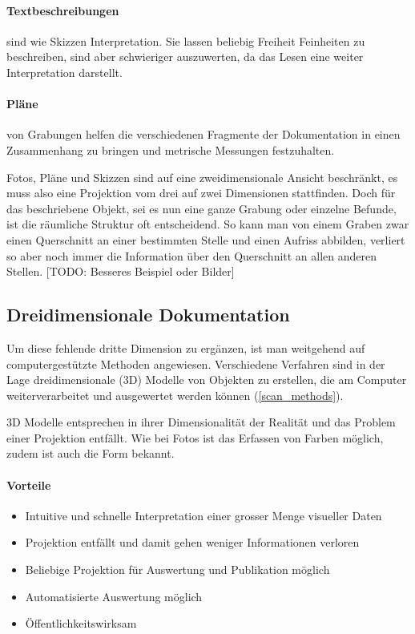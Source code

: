 \documentclass{paper}
\begin{document}
			\paragraph{Textbeschreibungen} sind wie Skizzen Interpretation. Sie lassen beliebig Freiheit Feinheiten zu beschreiben, sind aber schwieriger auszuwerten, da das Lesen eine weiter Interpretation darstellt.
			
			\paragraph{Pläne} von Grabungen helfen die verschiedenen Fragmente der Dokumentation in einen Zusammenhang zu bringen und metrische Messungen festzuhalten.
			
			\mbox{}
			
			Fotos, Pläne und Skizzen sind auf eine zweidimensionale Ansicht beschränkt, es muss also eine Projektion vom drei auf zwei Dimensionen stattfinden. Doch für das beschriebene Objekt, sei es nun eine ganze Grabung oder einzelne Befunde, ist die räumliche Struktur oft entscheidend.
			So kann man von einem Graben zwar einen Querschnitt an einer bestimmten Stelle und einen Aufriss abbilden, verliert so aber noch immer die Information über den Querschnitt an allen anderen Stellen.  
			[TODO: Besseres Beispiel oder Bilder]\\
		
		\subsection{Dreidimensionale Dokumentation}
			Um diese fehlende dritte Dimension zu ergänzen, ist man weitgehend auf computergestützte Methoden angewiesen. Verschiedene Verfahren sind in der Lage dreidimensionale (3D) Modelle von Objekten zu erstellen, die am Computer weiterverarbeitet und ausgewertet werden können (\autoref{scan_methods}).
			
			3D Modelle entsprechen in ihrer Dimensionalität der Realität und das Problem einer Projektion entfällt.
			Wie bei Fotos ist das Erfassen von Farben möglich, zudem ist auch die Form bekannt.
			
			\paragraph{Vorteile}
			\begin{itemize}
				\item
					Intuitive und schnelle Interpretation einer grosser Menge visueller Daten
				\item
					Projektion entfällt und damit gehen weniger Informationen verloren
				\item
					Beliebige Projektion für Auswertung und Publikation möglich
				\item
					Automatisierte Auswertung möglich
				\item
					Öffentlichkeitswirksam
			\end{itemize}
			
\end{document}
